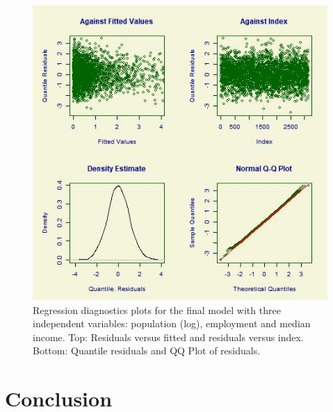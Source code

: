 \documentclass[sigconf]{acmart}
\begin{document}
\begin{figure}
\includegraphics[width=1.0\textwidth]{images/figure3.jpg}
\caption{Regression diagnostics plots for the final model with three independent variables: population (log), employment and median income. Top: Residuals versus fitted and residuals versus index.  Bottom: Quantile residuals and QQ Plot of residuals. }
\end{figure}


\section{Conclusion}

 
\end{document}
